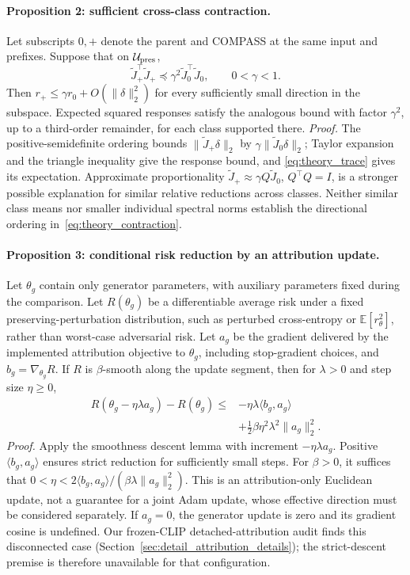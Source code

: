 \paragraph{Proposition 2: sufficient cross-class contraction.}
Let subscripts $0,+$ denote the parent and COMPASS at the same input and
prefixes. Suppose that on $\mathcal U_{\rm pres}$,
\begin{equation}
 \widetilde J_+^\top\widetilde J_+
 \preceq\gamma^2\widetilde J_0^\top\widetilde J_0,
 \qquad 0<\gamma<1.
\label{eq:theory_contraction}
\end{equation}
Then $r_+\le\gamma r_0+O(\|\delta\|_2^2)$ for every sufficiently small
direction in the subspace. Expected squared responses satisfy the analogous
bound with factor $\gamma^2$, up to a third-order remainder, for each class
supported there. \emph{Proof.} The positive-semidefinite ordering bounds
$\|\widetilde J_+\delta\|_2$ by $\gamma\|\widetilde J_0\delta\|_2$;
Taylor expansion and the triangle inequality give the response bound, and
\eqref{eq:theory_trace} gives its expectation. Approximate proportionality
$\widetilde J_+\approx\gamma Q\widetilde J_0$, $Q^\top Q=I$, is a stronger
possible explanation for similar relative reductions across classes.
Neither similar class means nor smaller individual spectral norms establish
the directional ordering in~\eqref{eq:theory_contraction}.

\paragraph{Proposition 3: conditional risk reduction by an attribution update.}
Let $\theta_g$ contain only generator parameters, with auxiliary parameters
fixed during the comparison. Let $R(\theta_g)$ be a differentiable average
risk under a fixed preserving-perturbation distribution, such as perturbed
cross-entropy or $\mathbb E[r_\theta^2]$, rather than worst-case adversarial
risk. Let $a_g$ be the gradient delivered by the implemented attribution
objective to $\theta_g$, including stop-gradient choices, and
$b_g=\nabla_{\theta_g}R$. If $R$ is $\beta$-smooth along the update segment,
then for $\lambda>0$ and step size $\eta\ge0$,
\begin{equation}
\begin{aligned}
 R(\theta_g-\eta\lambda a_g)-R(\theta_g)
 \le{}&-\eta\lambda\langle b_g,a_g\rangle\\
 &+\tfrac12\beta\eta^2\lambda^2\|a_g\|_2^2.
\end{aligned}
\label{eq:theory_descent}
\end{equation}
\emph{Proof.} Apply the smoothness descent lemma with increment
$-\eta\lambda a_g$. Positive $\langle b_g,a_g\rangle$ ensures strict
reduction for sufficiently small steps. For $\beta>0$, it suffices that
$0<\eta<2\langle b_g,a_g\rangle/(\beta\lambda\|a_g\|_2^2)$.
This is an attribution-only Euclidean update, not a guarantee for a joint
Adam update, whose effective direction must be considered separately.
If $a_g=0$, the generator update is zero and its gradient cosine is undefined.
Our frozen-CLIP detached-attribution audit finds this disconnected case
(Section~\ref{sec:detail_attribution_details}); the strict-descent premise is
therefore unavailable for that configuration.

